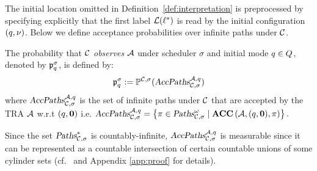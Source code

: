 The initial location omitted in Definition~\ref{def:interpretation} is preprocessed by specifying explicitly that the first label $\mathcal{L}(\ell^*)$ is read by the initial configuration $(q,\nu)$.
Below we define acceptance probabilities over infinite paths under $\mathcal{C}$.
\vspace{-0.3em}
\begin{definition}\label{def:accprob}
The probability that $\mathcal{C}$ \emph{observes} $\mathcal{A}$ under scheduler $\sigma$ and initial mode $q\in Q$, denoted by $\mathfrak{p}_{q}^{\sigma}$, is defined by:
\[
    \mathfrak{p}_{q}^{\sigma}
        :=
            \mathbb{P}^{\mathcal{C},\sigma}(
                \mbox{\sl AccPaths} _{\mathcal{C},\sigma} ^{\mathcal{A},q}
            )
\]
where $\mbox{\sl AccPaths} _{\mathcal{C},\sigma} ^{\mathcal{A},q}$ is the set of infinite paths under $\mathcal{C}$ that are accepted by the TRA $\mathcal{A}$ w.r.t $(q,\mathbf{0})$ i.e.
$
    \mbox{\sl AccPaths} _{\mathcal{C},\sigma} ^{\mathcal{A},q} = \left \{
        \pi \in \mbox{\sl Paths}^\omega_{\mathcal{C},\sigma} \mid
        \mbox{\bf ACC} \left( {\mathcal{A}}, {(q,\mathbf{0})}, {\pi} \right)
    \right\}.
$
\end{definition}
Since the set $\mbox{\sl Paths}^*_{\mathcal{C},\sigma}$ is countably-infinite,
$\mbox{\sl AccPaths} _{\mathcal{C},\sigma} ^{\mathcal{A},q}$ is measurable since it can be represented as a countable intersection of certain countable unions of some cylinder sets (cf.~\cite[Remark 10.24]{DBLP:books/daglib/0020348} and Appendix \ref{app:proof} for details).
